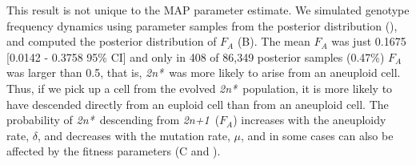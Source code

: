 \documentclass[12pt]{extarticle}
\newcommand{\anwt}{\emph{2n+1}}
\newcommand{\eumt}{\emph{2n*}}
\begin{document}
This result is not unique to the MAP parameter estimate. 
We simulated genotype frequency dynamics using parameter samples from the posterior distribution (), and computed the posterior distribution of $F_A$ (B). 
The mean $F_A$ was just 0.1675 [0.0142 - 0.3758 95\% CI] and only in 408 of 86,349 posterior samples (0.47\%) $F_A$ was  larger than 0.5, that is, \eumt\ was more likely to arise from an aneuploid cell.  
Thus, if we pick up a cell from the evolved \eumt\ population, it is more likely to have descended directly from an euploid cell than from an aneuploid cell.
The probability of \eumt\ descending from \anwt\ ($F_A$) increases with the aneuploidy rate, $\delta$, and decreases with the mutation rate, $\mu$, and in some cases can also be affected by the fitness parameters (C and ).
\end{document}
